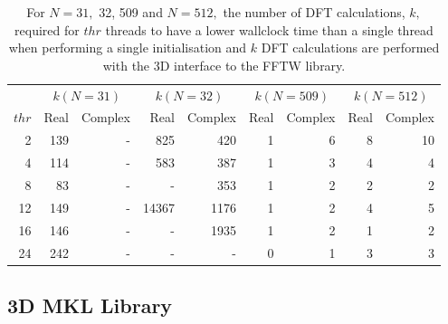 \documentclass[a4paper]{article}
\begin{document}
\begin{table}
\begin{center}
\begin{tabular}{|r||r|r||r|r||r|r||r|r|}
  \hline
 & \multicolumn{2}{|c||}{$k(N=31)$} & \multicolumn{2}{|c||}{$k(N=32)$} & \multicolumn{2}{|c||}{$k(N=509)$} & \multicolumn{2}{|c|}{$k(N=512)$} \\
$thr$ &  Real & Complex &  Real & Complex &  Real & Complex &  Real & Complex \\ \hline
  2 & 139  & -  &  825  & 420  & 1 &  6   & 8  & 10 \\
  4 & 114  & -  &  583  & 387  & 1 &  3   & 4  & 4  \\
  8 & 83   & -  &  -    & 353  & 1 &  2   & 2  & 2  \\
  12 & 149 & -  & 14367 & 1176 & 1 &  2   & 4  & 5  \\
  16 & 146 & -  &  -    & 1935 & 1 &  2   & 1  & 2  \\
  24 & 242 & -  &  -    &  -   & 0 &  1   & 3  & 3  \\ \hline
\end{tabular}
\caption{ For $N=31,$ 32, 509 and $N=512,$ the number of DFT calculations, $k,$ required for $thr$ threads to have a lower wallclock time than a single thread when performing  a single initialisation and $k$ DFT calculations are performed with the 3D interface to the FFTW library.  }\label{TblFFTW3dk}
\end{center}
\end{table}


\subsection{3D MKL Library}\label{Sec:3DMKL}
\end{document}

